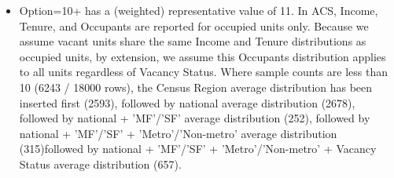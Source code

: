 \begin{itemize}
\item Option=10+ has a (weighted) representative value of 11. In ACS, Income, Tenure, and Occupants are reported for occupied units only. Because we assume vacant units share the same Income and Tenure distributions as occupied units, by extension, we assume this Occupants distribution applies to all units regardless of Vacancy Status. Where sample counts are less than 10 (6243 / 18000 rows), the Census Region average distribution has been inserted first (2593), followed by national average distribution (2678), followed by national + 'MF'/'SF' average distribution (252), followed by national + 'MF'/'SF' + 'Metro'/'Non-metro' average distribution (315)followed by national + 'MF'/'SF' + 'Metro'/'Non-metro' + Vacancy Status average distribution (657).
\end{itemize}
